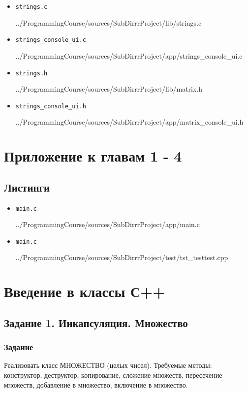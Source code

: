 \documentclass[12pt,a4paper]{report}
\begin{document}
\begin{itemize}
\item[] \verb-strings.c-

{../ProgrammingCourse/sources/SubDirrrProject/lib/strings.c}
\item[] \verb-strings_console_ui.c-

{../ProgrammingCourse/sources/SubDirrrProject/app/strings_console_ui.c}
\item[] \verb-strings.h-

{../ProgrammingCourse/sources/SubDirrrProject/lib/matrix.h}
\item[] \verb-strings_console_ui.h-

{../ProgrammingCourse/sources/SubDirrrProject/app/matrix_console_ui.h}
\end{itemize}
%

\chapter{Приложение к главам 1 - 4}

\section{Листинги}
\begin{itemize}
\item[] \verb-main.c-

{../ProgrammingCourse/sources/SubDirrrProject/app/main.c}
\item[] \verb-main.c-

{../ProgrammingCourse/sources/SubDirrrProject/test/tst_testtest.cpp}
\end{itemize}
%

\chapter{Введение в классы С++}
\section{Задание 1. Инкапсуляция. Множество}
\subsection{Задание}
\hspace{\parindent}
Реализовать класс МНОЖЕСТВО (целых чисел). Требуемые методы: конструктор, деструктор, копирование, сложение множеств, пересечение множеств, добавление в множество, включение в множество.
\end{document}
